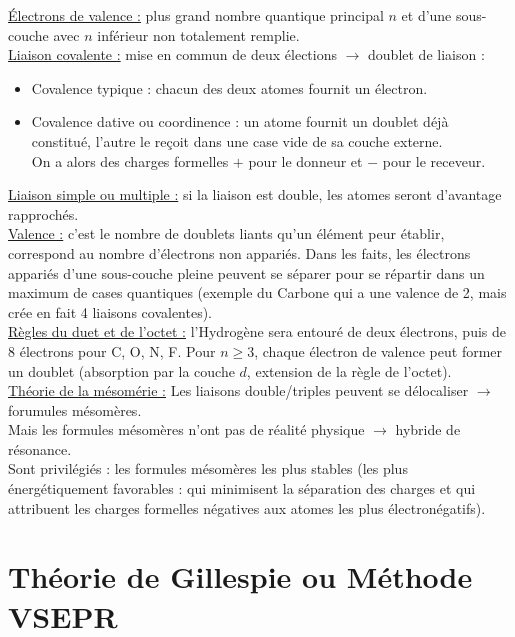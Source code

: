 \documentclass[13pt, twoside, a4paper, french, tikz]{report}
\begin{document}
    \underline{Électrons de valence :} plus grand nombre quantique principal $n$ et d'une sous-couche avec $n$ inférieur non totalement remplie.\\
    
    \underline{Liaison covalente :} mise en commun de deux élections $\rightarrow$ doublet de liaison :
    \begin{itemize}
      \item Covalence typique : chacun des deux atomes fournit un électron.
      \item Covalence dative ou coordinence : un atome fournit un doublet déjà constitué, l'autre le reçoit dans une case vide de sa couche externe.\\
      On a alors des charges formelles $+$ pour le donneur et $-$ pour le receveur.\\
    \end{itemize}
    
    \underline{Liaison simple ou multiple :} si la liaison est double, les atomes seront d'avantage rapprochés.\\
    
    \underline{Valence :} c'est le nombre de doublets liants qu'un élément peur établir, correspond au nombre d'électrons non appariés.
    Dans les faits, les électrons appariés d'une sous-couche pleine peuvent se séparer pour se répartir dans un maximum de cases quantiques (exemple du Carbone qui a une valence de 2, mais crée en fait 4 liaisons covalentes).\\
    
    \underline{Règles du duet et de l'octet :} l'Hydrogène sera entouré de deux électrons, puis de 8 électrons pour C, O, N, F.
    Pour $n \ge 3$, chaque électron de valence peut former un doublet (absorption par la couche $d$, extension de la règle de l'octet).\\
    
    \underline{Théorie de la mésomérie :} Les liaisons double/triples peuvent se délocaliser $\rightarrow$ forumules mésomères.\\
    Mais les formules mésomères n'ont pas de réalité physique $\rightarrow$ hybride de résonance.\\
    Sont privilégiés : les formules mésomères les plus stables (les plus énergétiquement favorables : qui minimisent la séparation des charges et qui attribuent les charges formelles négatives aux atomes les plus électronégatifs).
  
  
  \section{Théorie de Gillespie ou Méthode VSEPR}\label{sec:theorie-de-gillespie-ou-methode-vsepr}
    
\end{document}
